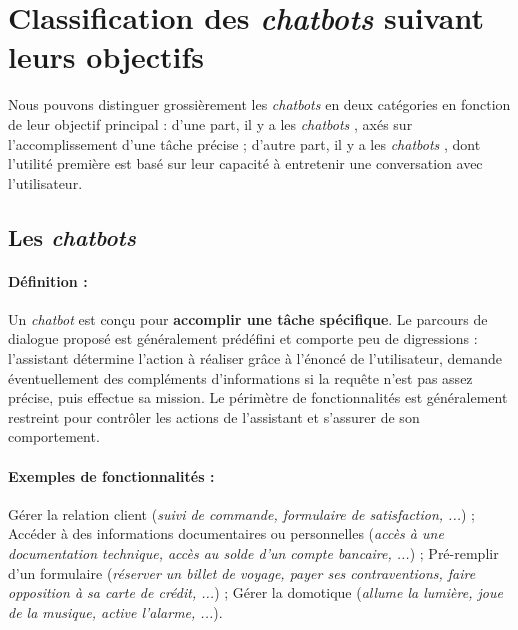 	\section{Classification des \textit{chatbots} suivant leurs objectifs}
	\label{annex:B.1-CHATBOT-CLASSIFICATION}
		
		Nous pouvons distinguer grossièrement les \textit{chatbots} en deux catégories en fonction de leur objectif principal :
		d'une part, il y a les \textit{chatbots} , axés sur l'accomplissement d'une tâche précise ;
		d'autre part, il y a les \textit{chatbots} , dont l'utilité première est basé sur leur capacité à entretenir une conversation avec l'utilisateur.
		
		
		\subsection{Les \textit{chatbots} }
		\label{annex:B.1.1-CHATBOT-CLASSIFICATION-TASK-ORIENTED}
		
			\paragraph{Définition :}
				
				Un \textit{chatbot}  est conçu pour \textbf{accomplir une tâche spécifique}.
				Le parcours de dialogue proposé est généralement prédéfini et comporte peu de digressions : l'assistant détermine l'action à réaliser grâce à l'énoncé de l'utilisateur, demande éventuellement des compléments d'informations si la requête n'est pas assez précise, puis effectue sa mission.
				Le périmètre de fonctionnalités est généralement restreint pour contrôler les actions de l'assistant et s'assurer de son comportement.
			
			\paragraph{Exemples de fonctionnalités :}
				
				Gérer la relation client (\textit{suivi de commande, formulaire de satisfaction, ...}) ;
				Accéder à des informations documentaires ou personnelles (\textit{accès à une documentation technique, accès au solde d'un compte bancaire, ...}) ;
				Pré-remplir d'un formulaire (\textit{réserver un billet de voyage, payer ses contraventions, faire opposition à sa carte de crédit, ...}) ;
				 Gérer la domotique (\textit{allume la lumière, joue de la musique, active l'alarme, ...}).
			
